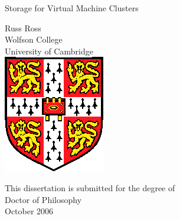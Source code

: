 \pagestyle{empty}

\begin{center}
\vspace*{\fill}

%

\Huge
Storage for Virtual Machine Clusters

\vfill
\vfill

\LARGE 
Russ Ross\\[6mm]
Wolfson College\\
University of Cambridge\\

\vfill
\includegraphics{eps/camshield}
\vfill

\Large
This dissertation is submitted for the degree of\\
Doctor of Philosophy\\[4mm]

October 2006

\vspace*{\fill}
\end{center}
\cleardoublepage

\pagestyle{plain}

%

\enlargethispage*{60cm}        %
{
  
}

\cleardoublepage

%

\enlargethispage*{60cm}        %
 {
        
 }

\cleardoublepage

%

